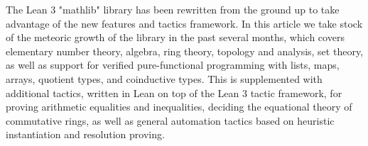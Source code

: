 The Lean 3 "mathlib" library has been rewritten from the ground up to take advantage of the new features and tactics framework. In this article we take stock of the meteoric growth of the library in the past several months, which covers elementary number theory, algebra, ring theory, topology and analysis, set theory, as well as support for verified pure-functional programming with lists, maps, arrays, quotient types, and coinductive types. This is supplemented with additional tactics, written in Lean on top of the Lean 3 tactic framework, for proving arithmetic equalities and inequalities, deciding the equational theory of commutative rings, as well as general automation tactics based on heuristic instantiation and resolution proving.
